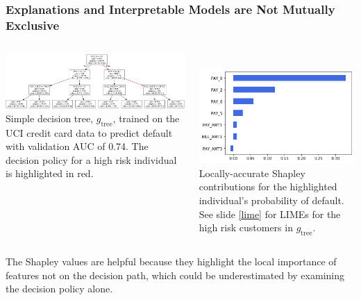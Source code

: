 \documentclass[11pt,
               aspectratio=169,
               hyperref={colorlinks}
               ]{beamer}
\begin{document}
	\begin{frame}[label={dt}]
	
		\frametitle{Explanations and Interpretable Models are Not Mutually Exclusive}	
		
		\begin{columns}
				
			\centering		
			\includegraphics[height=.45\linewidth, width=1.15\linewidth]{img/dt.png}\\
			\vspace{5pt}
  			\tiny{Simple decision tree, $g_{\text{tree}}$, trained on the UCI credit card data to predict default with validation AUC of 0.74. The decision policy for a high risk individual is highlighted in red.}

			\hspace{50pt}
			\centering
			\vspace{2pt}\\
  			\includegraphics[height=.5\linewidth, width=.8\linewidth]{img/shap.png}\\
  			\vspace{5pt}
  			\tiny{Locally-accurate Shapley contributions for the highlighted individual's probability of default. See slide \ref{lime} for LIMEs for the high risk customers in $g_{\text{tree}}$.}

		\end{columns}
		\vspace{10pt}

	\scriptsize{The Shapley values are helpful because they highlight the local importance of features not on the decision path, which could be underestimated by examining the decision policy alone.}
	
	\end{frame}
	
\end{document}
